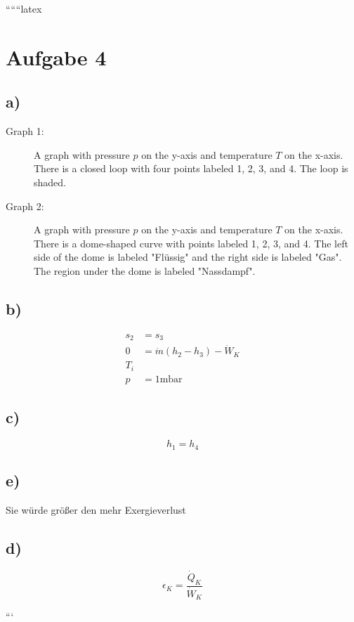 
``````latex


\section*{Aufgabe 4}

\subsection*{a)}
\begin{description}
    \item[Graph 1:] A graph with pressure \( p \) on the y-axis and temperature \( T \) on the x-axis. There is a closed loop with four points labeled 1, 2, 3, and 4. The loop is shaded.
    \item[Graph 2:] A graph with pressure \( p \) on the y-axis and temperature \( T \) on the x-axis. There is a dome-shaped curve with points labeled 1, 2, 3, and 4. The left side of the dome is labeled "Flüssig" and the right side is labeled "Gas". The region under the dome is labeled "Nassdampf".
\end{description}

\subsection*{b)}
\begin{align*}
    s_2 &= s_3 \\
    0 &= \dot{m} (h_2 - h_3) - \dot{W}_K \\
    T_i \\
    p &= 1 \text{mbar}
\end{align*}

\subsection*{c)}
\begin{equation*}
    h_1 = h_4
\end{equation*}

\subsection*{e)}
Sie würde größer den mehr Exergieverlust

\subsection*{d)}
\begin{equation*}
    \epsilon_K = \frac{\dot{Q}_K}{\dot{W}_K}
\end{equation*}

```